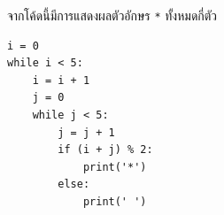 \question จากโค้ดนี้มีการแสดงผลตัวอักษร \texttt{*} ทั้งหมดกี่ตัว
\begin{verbatim}
i = 0
while i < 5:
    i = i + 1
    j = 0
    while j < 5:
        j = j + 1
        if (i + j) % 2:
            print('*')
        else:
            print(' ')
\end{verbatim}
